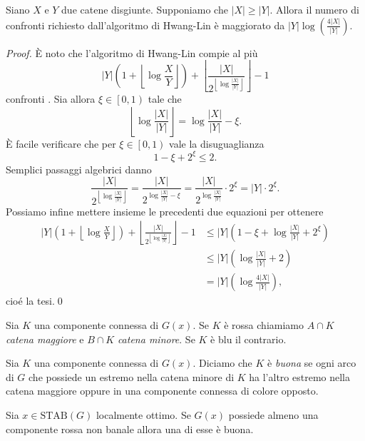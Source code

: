 \begin{lemma}
	\label{hwanglinlemma} Siano \(X\) e \(Y\) due catene disgiunte. Supponiamo che \(|X|\ge|Y|\). Allora il numero di confronti richiesto dall'algoritmo di Hwang-Lin è maggiorato da \(|Y|\log(\frac{4|X|}{|Y|})\). 
\end{lemma}
\begin{proof}
	È noto che l'algoritmo di Hwang-Lin compie al più
	\[|Y|\left(1+\left\lfloor{\log{\frac{X}{Y}}}\right\rfloor\right)+\left\lfloor\frac{|X|}{2^{\left\lfloor\log{\frac{|X|}{|Y|}}\right\rfloor}}\right\rfloor-1\]
	confronti \cite{Hwang1972}. Sia allora \(\xi\in\left[0,1\right)\) tale che
	\[\left\lfloor\log{\frac{|X|}{|Y|}}\right\rfloor=\log{\frac{|X|}{|Y|}}-\xi.\]
	È facile verificare che per \(\xi\in\left[0,1\right)\) vale la disuguaglianza
	\[1-\xi+2^{\xi}\le 2.\]
	Semplici passaggi algebrici danno
	\[\frac{|X|}{2^{\left\lfloor\log{\frac{|X|}{|Y|}}\right\rfloor}}=\frac{|X|}{2^{\log{\frac{|X|}{|Y|}}-\xi}}=\frac{|X|}{2^{\log{\frac{|X|}{|Y|}}}}\cdot 2^{\xi}=|Y|\cdot 2^{\xi}.\]
	Possiamo infine mettere insieme le precedenti due equazioni per ottenere 
	\begin{align}
		|Y|\left(1+\left\lfloor{\log{\frac{X}{Y}}}\right\rfloor\right)+\left\lfloor\frac{|X|}{2^{\left\lfloor\log{\frac{|X|}{|Y|}}\right\rfloor}}\right\rfloor-1&\le|Y|\left(1-\xi+\log{\frac{|X|}{|Y|}}+2^{\xi}\right) \nonumber \\
		&\le |Y|\left(\log{\frac{|X|}{|Y|}}+2\right) \nonumber \\
		&= |Y|\left(\log{\frac{4|X|}{|Y|}}\right), \nonumber 
	\end{align}
	cioé la tesi.\qed 
\end{proof}
\begin{definition}
	Sia \(K\) una componente connessa di \(G(x)\). Se \(K\) è rossa chiamiamo \(A\cap K\) \emph{catena maggiore} e \(B\cap K\) \emph{catena minore}. Se \(K\) è blu il contrario. 
\end{definition}
\begin{definition}
	Sia \(K\) una componente connessa di \(G(x)\). Diciamo che \(K\) è \emph{buona} se ogni arco di \(G\) che possiede un estremo nella catena minore di \(K\) ha l'altro estremo nella catena maggiore oppure in una componente connessa di colore opposto. 
\end{definition}
\begin{lemma}
	\label{goodlemma} Sia \(x\in \text{STAB}(G)\) localmente ottimo. Se \(G(x)\) possiede almeno una componente rossa non banale allora una di esse è buona. 
\end{lemma}

